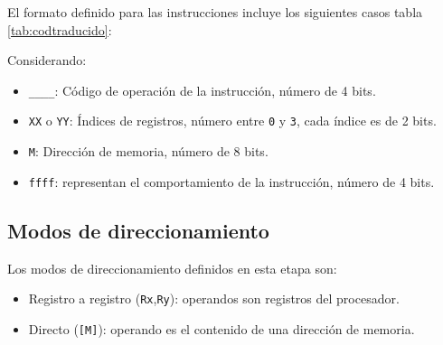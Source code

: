 \documentclass[12pt,oneside]{templates/unerthesis}
\providecommand{\tightlist}{%
  \setlength{\itemsep}{0pt}\setlength{\parskip}{0pt}}
\begin{document}
El formato definido para las instrucciones incluye los siguientes casos tabla \ref{tab:codtraducido}:

\begin{table}[!h]
\centering
\caption{\label{tab:codtraducido}Tabla de codificación de instrucciones}
\centering
{}
\end{table}

Considerando:

\begin{itemize}
\item
  \texttt{\_\_\_\_}: Código de operación de la instrucción, número de 4 bits.
\item
  \texttt{XX} o \texttt{YY}: Índices de registros, número entre \texttt{0} y \texttt{3}, cada índice es de 2 bits.
\item
  \texttt{M}: Dirección de memoria, número de 8 bits.
\item
  \texttt{ffff}: representan el comportamiento de la instrucción, número de 4 bits.
\end{itemize}

\hypertarget{modos-de-direccionamiento-1}{%
\subsection{Modos de direccionamiento}\label{modos-de-direccionamiento-1}}

Los modos de direccionamiento definidos en esta etapa son:

\begin{itemize}
\tightlist
\item
  Registro a registro (\texttt{Rx},\texttt{Ry}): operandos son registros del procesador.
\item
  Directo (\texttt{{[}M{]}}): operando es el contenido de una dirección de memoria.
\end{itemize}
\end{document}
